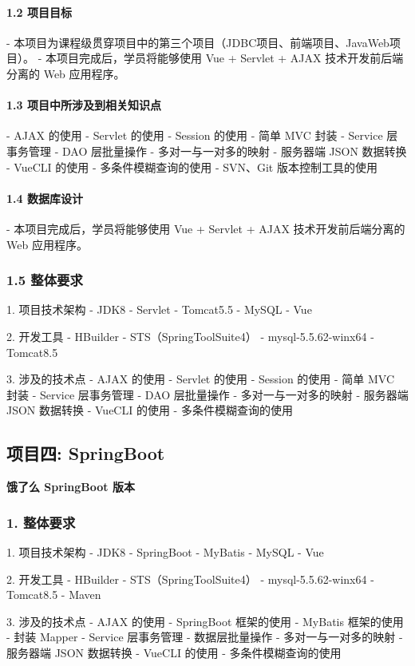 \paragraph*{1.2 项目目标}
- 本项目为课程级贯穿项目中的第三个项目（JDBC项目、前端项目、JavaWeb项目）。
- 本项目完成后，学员将能够使用 Vue + Servlet + AJAX 技术开发前后端分离的 Web 应用程序。

\paragraph*{1.3 项目中所涉及到相关知识点}
- AJAX 的使用
- Servlet 的使用
- Session 的使用
- 简单 MVC 封装
- Service 层事务管理
- DAO 层批量操作
- 多对一与一对多的映射
- 服务器端 JSON 数据转换
- VueCLI 的使用
- 多条件模糊查询的使用
- SVN、Git 版本控制工具的使用

\paragraph*{1.4 数据库设计}
- 本项目完成后，学员将能够使用 Vue + Servlet + AJAX 技术开发前后端分离的 Web 应用程序。

\subsubsection*{1.5 整体要求}
1. 项目技术架构
   - JDK8
   - Servlet
   - Tomcat5.5
   - MySQL
   - Vue
   
2. 开发工具
   - HBuilder
   - STS（SpringToolSuite4）
   - mysql-5.5.62-winx64
   - Tomcat8.5
   
3. 涉及的技术点
   - AJAX 的使用
   - Servlet 的使用
   - Session 的使用
   - 简单 MVC 封装
   - Service 层事务管理
   - DAO 层批量操作
   - 多对一与一对多的映射
   - 服务器端 JSON 数据转换
   - VueCLI 的使用
   - 多条件模糊查询的使用


\subsection*{项目四: SpringBoot}
\textbf{饿了么 SpringBoot 版本}

\subsubsection*{1. 整体要求}
1. 项目技术架构
   - JDK8
   - SpringBoot
   - MyBatis
   - MySQL
   - Vue
   
2. 开发工具
   - HBuilder
   - STS（SpringToolSuite4）
   - mysql-5.5.62-winx64
   - Tomcat8.5
   - Maven
   
3. 涉及的技术点
   - AJAX 的使用
   - SpringBoot 框架的使用
   - MyBatis 框架的使用
   - 封装 Mapper
   - Service 层事务管理
   - 数据层批量操作
   - 多对一与一对多的映射
   - 服务器端 JSON 数据转换
   - VueCLI 的使用
   - 多条件模糊查询的使用
